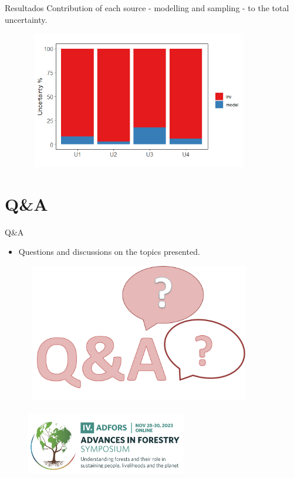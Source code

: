 \documentclass{beamer}
\begin{document}
\begin{frame}{Resultados}
Contribution of each source - modelling and sampling - to the total uncertainty.
\begin{figure}
        \centering
        \includegraphics[width = 10cm, height = 6cm]{pic/Resultado2.png}
        \end{figure}
\end{frame}

\section{Q\&A}
\begin{frame}{Q\&A}
\begin{itemize}
    \item Questions and discussions on the topics presented.
\end{itemize}
\begin{figure}
        \centering
        \includegraphics[width = 10cm, height = 6cm]{pic/q&a.jpg}
        \end{figure}
\end{frame}

\begin{frame}
\centering
{}
\begin{figure}
        \centering
        \includegraphics[width = 7cm, height = 3cm]{polyu.png}
\end{figure}
\end{frame}
\end{document}
